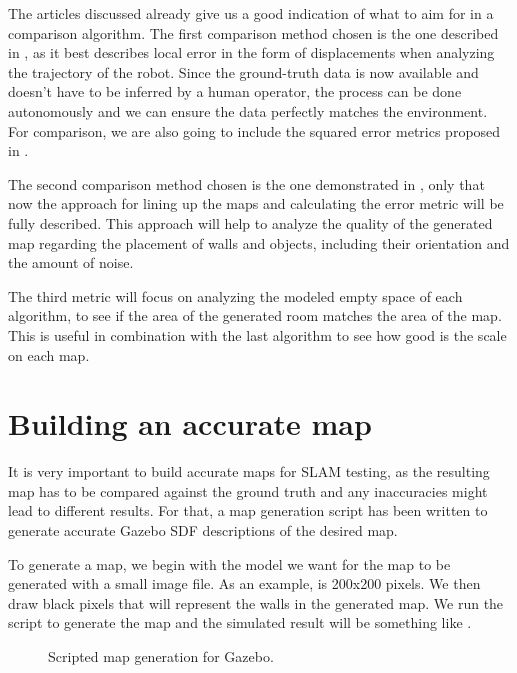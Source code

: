 The articles discussed already give us a good indication of what to aim for in a comparison algorithm. The first comparison method chosen is the one described in \cite{kummerle2009measuring}, as it best describes local error in the form of displacements when analyzing the trajectory of the robot. Since the ground-truth data is now available and doesn't have to be inferred by a human operator, the process can be done autonomously and we can ensure the data perfectly matches the environment. For comparison, we are also going to include the squared error metrics proposed in .

The second comparison method chosen is the one demonstrated in \cite{santos2013evaluation}, only that now the approach for lining up the maps and calculating the error metric will be fully described. This approach will help to analyze the quality of the generated map regarding the placement of walls and objects, including their orientation and the amount of noise.

The third metric will focus on analyzing the modeled empty space of each algorithm, to see if the area of the generated room matches the area of the map. This is useful in combination with the last algorithm to see how good is the scale on each map.

\section{Building an accurate map}

It is very important to build accurate maps for SLAM testing, as the resulting map has to be compared against the ground truth and any inaccuracies might lead to different results. For that, a map generation script has been written to generate accurate Gazebo SDF descriptions of the desired map.

To generate a map, we begin with the model we want for the map to be generated with a small image file. As an example,  is 200x200 pixels. We then draw black pixels that will represent the walls in the generated map. We run the script to generate the map and the simulated result will be something like .

\begin{figure}[!ht]
     \centering
     \hfill
     \caption{Scripted map generation for Gazebo.}
     \label{fig:map_generation_script}
\end{figure}

